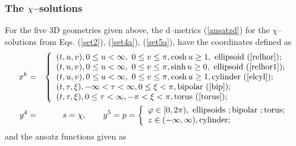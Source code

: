 \documentclass[a4paper,preprint,prabib,aps]{revtex4}
\begin{document}
\subsubsection{The $\protect\chi$--solutions}

For the five 3D geometries given above, the d--metrics (\ref{ansatzd}) for
the $\chi $--solutions from Eqs. (\ref{set2}), (\ref{set4a}), (\ref{set5a}),
have the coordinates defined as
\begin{eqnarray}
x^{k} &=&\left\{
\begin{array}{l}
(t,u,v),0\leq u<\infty ,\ 0\leq v\leq \pi ,\cosh u\geq 1,%
\mbox{ ellipsoid
(\ref{relhor})}; \\
(t,u,v),0\leq u<\infty ,\ 0\leq v\leq \pi ,\sinh u\geq 0,%
\mbox{ ellipsoid
(\ref{relhor1})}; \\
(t,u,v),0\leq u<\infty ,\ 0\leq v\leq \pi ,\cosh u\geq 1,%
\mbox{cylinder
(\ref{elcyl})}; \\
(t,\tau ,\xi ),-\infty <\tau <\infty ,0\leq \xi <\pi ,%
\mbox{bipolar
(\ref{bip})}; \\
(t,\tau ,\xi ),0\leq \tau <\infty ,-\pi <\xi <\pi ,%
\mbox{torus
(\ref{torus})};
\end{array}
\right.   \nonumber \\
y^{4} &=&s=\chi ,\qquad y^{5}=p=\left\{
\begin{array}{l}
\varphi \in \lbrack 0,2\pi ),\mbox{ ellipsoids };\mbox{bipolar };\mbox{torus}%
; \\
z\in (-\infty ,\infty ),\mbox{cylinder};
\end{array}
\right.   \nonumber
\end{eqnarray}
and the ansatz functions given as
\end{document}
